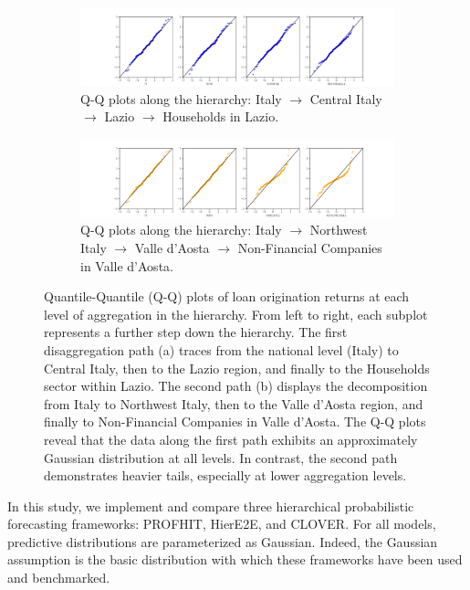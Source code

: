 \documentclass[letterpaper]{article}
\begin{document}
\begin{figure}
    \centering
     \begin{subfigure}[b]{\textwidth}
         \centering
         \includegraphics[width=\textwidth]{QQplots_lazio.png}
         \caption{Q-Q plots along the hierarchy: Italy $\rightarrow$ Central Italy $\rightarrow$ Lazio $\rightarrow$ Households in Lazio.}
         \label{fig:y equals x}
     \end{subfigure}
     \begin{subfigure}[b]{\textwidth}
         \centering
         \includegraphics[width=\textwidth]{QQplots_valee.png}
         \caption{Q-Q plots along the hierarchy: Italy $\rightarrow$ Northwest Italy $\rightarrow$ Valle d'Aosta $\rightarrow$ Non-Financial Companies in Valle d'Aosta.}
         \label{fig:three sin x}
     \end{subfigure}
     \hfill
        \caption{
Quantile-Quantile (Q-Q) plots of loan origination returns at each level of aggregation in the hierarchy. From left to right, each subplot represents a further step down the hierarchy. The first disaggregation path (a) traces from the national level (Italy) to Central Italy, then to the Lazio region, and finally to the Households sector within Lazio. The second path (b) displays the decomposition from Italy to Northwest Italy, then to the Valle d'Aosta region, and finally to Non-Financial Companies in Valle d'Aosta. The Q-Q plots reveal that the data along the first path exhibits an approximately Gaussian distribution at all levels. In contrast, the second path demonstrates heavier tails, especially at lower aggregation levels.
}
        \label{fig:qqplots}
\end{figure}

In this study, we implement and compare three hierarchical probabilistic forecasting frameworks: PROFHIT, HierE2E, and CLOVER. For all models, predictive distributions are parameterized as Gaussian. Indeed, the Gaussian assumption is the basic distribution with which these frameworks have been used and benchmarked. 
\end{document}
